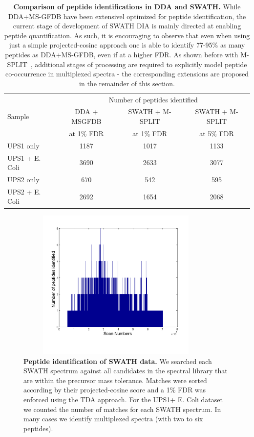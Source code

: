 \documentclass[arial,11pt]{article}
\begin{document}
\begin{table}[h!]
\small
\centering	
\begin{tabular}[c]{l|c|c|c}
   & \multicolumn{3}{c}{Number of peptides identified} \\
   Sample   &  DDA + MSGFDB  & SWATH + M-SPLIT   & SWATH + M-SPLIT \\
            &    at 1\% FDR    & at 1\% FDR & at 5\% FDR\\
          \hline
 UPS1 only  &  1187   & 1017  & 1133\\
 UPS1 + E. Coli &  3690 & 2633 & 3077\\
 UPS2 only  &  670 & 542 & 595       \\
 UPS2 + E. Coli & 2692 & 1654 & 2068\\
\end{tabular}
\caption{\footnotesize{\bf Comparison of peptide identifications in DDA and SWATH.} While DDA+MS-GFDB have been extensivel optimized for peptide identification, the current stage of development of SWATH DIA is mainly directed at enabling peptide quantification. As such, it is encouraging to observe that even when using just a simple projected-cosine approach one is able to identify 77-95\% as many peptides as DDA+MS-GFDB, even if at a higher FDR. As shown before with M-SPLIT~\cite{wang2010msplit}, additional stages of processing are required to explicitly model peptide co-occurrence in multiplexed spectra \-- the corresponding extensions are proposed in the remainder of this section.}
	\label{tab:SWATH_IDs}
\end{table}

\begin{figure}[h!]
\centering
\includegraphics[height=75mm, width=100mm]{./Figures/swath_pepcounts}
\caption{\footnotesize {\bf Peptide identification of SWATH data.} We searched each SWATH spectrum against all candidates in the spectral library that are within the precursor mass tolerance.  Matches were sorted according by their projected-cosine score and a 1\% FDR was enforced using the TDA approach.  For the UPS1+ E. Coli dataset we counted the number of matches for each SWATH spectrum.  In many cases we identify multiplexed spectra (with two to six peptides).
}
\label{Swath_pep_counts}
\end{figure}
	
\end{document}
